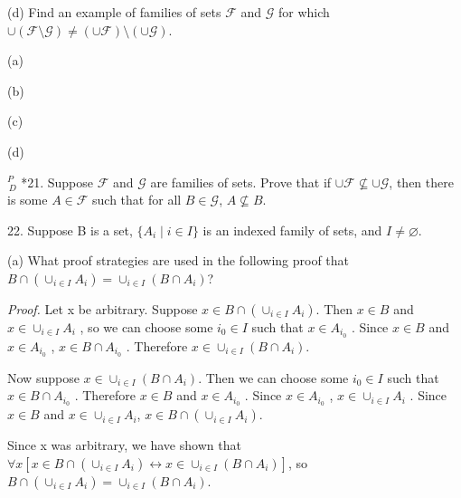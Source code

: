 \documentclass{article}
\begin{document}
\hspace{12pt}(d) Find an example of families of sets $\mathcal{F}$ and $\mathcal{G}$ for which $\cup (\mathcal{F} \setminus \mathcal{G}) \neq (\cup\mathcal{F}) \setminus (\cup\mathcal{G})$.
\vspace{30pt}

(a)

\vspace{30pt}

(b)

\vspace{30pt}

(c)

\vspace{30pt}

(d)

\vspace{30pt}

$^{\textit{P}}_{\, \textit{D}}$ *21. Suppose $\mathcal{F}$ and $\mathcal{G}$ are families of sets. Prove that if $\cup \mathcal{F} \nsubseteq \cup\mathcal{G}$, then there is some $A \in \mathcal{F}$ such that for all $B \in \mathcal{G}$, $A \nsubseteq B$.
\vspace{30pt}



\vspace{30pt}

22. Suppose B is a set, $\{A_i \mid i \in I\}$ is an indexed family of sets, and $I \neq \varnothing$.

\hspace{12pt}(a) What proof strategies are used in the following proof that $B \cap
(\cup_{i \in I} A_i) = \cup_{i \in I} (B \cap A_i)$?

\textit{Proof.} Let x be arbitrary. Suppose $x \in B \cap (\cup_{i \in I} A_i)$. Then $x \in B$
and $x \in \cup_{i \in I} A_i$ , so we can choose some $i_0 \in I$ such that $x \in A_{i_0}$ .
Since $x \in B$ and $x \in A_{i_0}$ , $x \in B \cap A_{i_0}$ . Therefore $x \in \cup_{i \in I} (B \cap
A_i)$.

Now suppose $x \in \cup_{i \in I} (B \cap A_i)$. Then we can choose some $i_0 \in
I$ such that $x \in B \cap A_{i_0}$ . Therefore $x \in B$ and $x \in A_{i_0}$ . Since $x \in
A_{i_0}$ , $x \in \cup_{i \in I} A_i$ . Since $x \in B$ and $x \in \cup_{i \in I} A_i$, $x \in B \cap (\cup_{i \in I} A_i)$.

Since x was arbitrary, we have shown that $\forall x[x \in B \cap (\cup_{i \in I} A_i) \leftrightarrow x \in \cup_{i \in I} (B \cap A_i)]$, so $B \cap (\cup_{i \in I} A_i) = \cup_{i \in I} (B \cap A_i)$.
\end{document}
